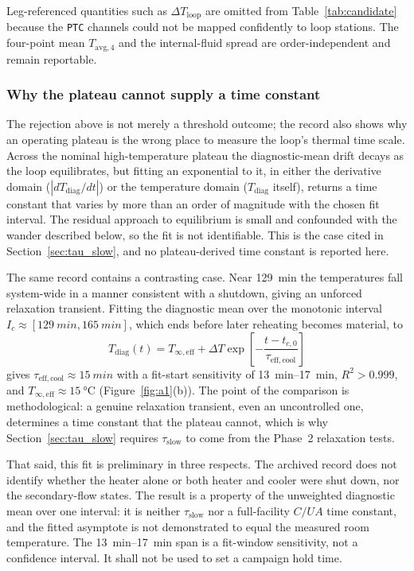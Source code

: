 \documentclass[11pt]{article}
\newcommand{\Tavg}{T_{\mathrm{avg},4}}
\newcommand{\Tdiag}{T_{\mathrm{diag}}}
\begin{document}
Leg-referenced quantities such as $\Delta T_{\mathrm{loop}}$ are omitted from
Table~\ref{tab:candidate} because the \texttt{PTC} channels could not be mapped
confidently to loop stations. The four-point mean $\Tavg$ and the internal-fluid
spread are order-independent and remain reportable.

\subsubsection{Why the plateau cannot supply a time constant}

The rejection above is not merely a threshold outcome; the record also shows
why an operating plateau is the wrong place to measure the loop's thermal time
scale. Across the nominal high-temperature plateau the diagnostic-mean drift
decays as the loop equilibrates, but fitting an exponential to it, in either
the derivative domain ($|d\Tdiag/dt|$) or the temperature domain ($\Tdiag$
itself), returns a time constant that varies by more than an order of magnitude
with the chosen fit interval. The residual approach to equilibrium is small and
confounded with the wander described below, so the fit is not identifiable.
This is the case cited in Section~\ref{sec:tau_slow}, and no plateau-derived
time constant is reported here.

The same record contains a contrasting case. Near \SI{129}{min} the
temperatures fall system-wide in a manner consistent with a shutdown, giving an
unforced relaxation transient. Fitting the diagnostic mean over the monotonic
interval $I_c\approx[\SI{129}{min},\SI{165}{min}]$, which ends before later
reheating becomes material, to
\begin{equation}
\Tdiag(t)=T_{\infty,\mathrm{eff}}
+\Delta T\exp\!\left[-\frac{t-t_{c,0}}{\tau_{\mathrm{eff,cool}}}\right]
\label{eq:prelim_cooldown_fit}
\end{equation}
gives $\tau_{\mathrm{eff,cool}}\approx\SI{15}{min}$ with a fit-start
sensitivity of \SIrange{13}{17}{min}, $R^2>0.999$, and
$T_{\infty,\mathrm{eff}}\approx\SI{15}{\degreeCelsius}$
(Figure~\ref{fig:a1}(b)). The point of the comparison is methodological: a
genuine relaxation transient, even an uncontrolled one, determines a time
constant that the plateau cannot, which is why
Section~\ref{sec:tau_slow} requires $\tau_{\mathrm{slow}}$ to come from the
Phase~2 relaxation tests.

That said, this fit is preliminary in three respects. The archived record does
not identify whether the heater alone or both heater and cooler were shut down,
nor the secondary-flow states. The result is a property of the unweighted
diagnostic mean over one interval: it is neither $\tau_{\mathrm{slow}}$ nor a
full-facility $C/UA$ time constant, and the fitted asymptote is not
demonstrated to equal the measured room temperature. The
\SIrange{13}{17}{min} span is a fit-window sensitivity, not a confidence
interval. It shall not be used to set a campaign hold time.
\end{document}
